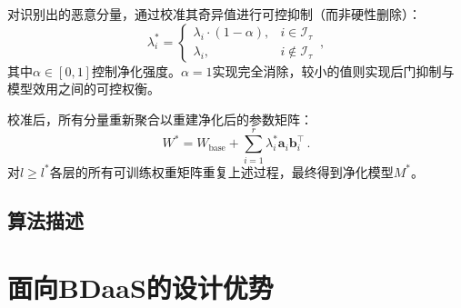 对识别出的恶意分量，通过校准其奇异值进行可控抑制（而非硬性删除）：
\begin{equation}
\label{eq:singular_calibrate}
\lambda_i^* = \begin{cases} \lambda_i \cdot (1 - \alpha), & i \in \mathcal{I}_\tau \\ \lambda_i, & i \notin \mathcal{I}_\tau \end{cases} \, ,
\end{equation}
其中$\alpha \in [0, 1]$控制净化强度。$\alpha = 1$实现完全消除，较小的值则实现后门抑制与模型效用之间的可控权衡。

校准后，所有分量重新聚合以重建净化后的参数矩阵：
\begin{equation}
W^* = W_{\text{base}} + \sum_{i=1}^{r} \lambda_i^* \mathbf{a}_i \mathbf{b}_i^\top \, .
\end{equation}
对$l \geq l^*$各层的所有可训练权重矩阵重复上述过程，最终得到净化模型$M^*$。

\subsection{算法描述}

\begin{algorithm}[htbp]
\caption{模型净化（阶段四）}
\label{alg:stage4}
\;
\end{algorithm}

\section{面向BDaaS的设计优势}

